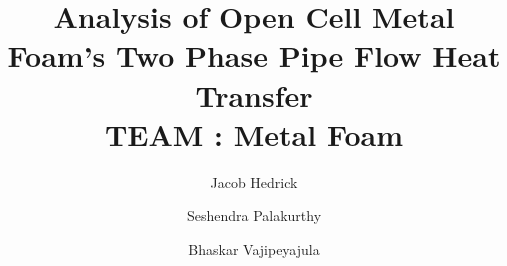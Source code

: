\documentclass[asme2ejs.tex]{subfiles}
\begin{document}
\title{Analysis of Open Cell Metal Foam's Two Phase Pipe Flow Heat Transfer \\ TEAM : Metal Foam}


\author{Jacob Hedrick %

%	
}

\author{Seshendra Palakurthy%
}

\author{Bhaskar Vajipeyajula%

}

\maketitle 
\end{document}
